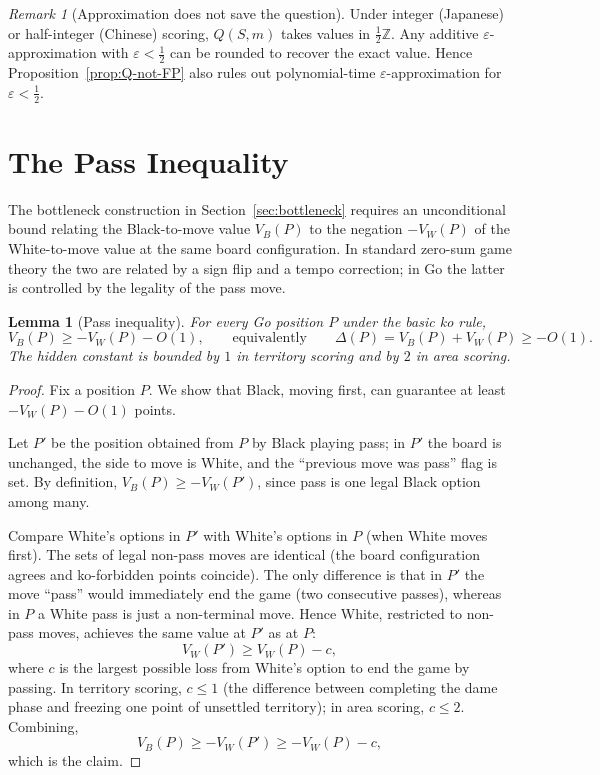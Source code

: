 \documentclass[11pt,a4paper]{amsart}
\theoremstyle{plain}
\newtheorem{lemma}[theorem]{Lemma}
\theoremstyle{definition}
\theoremstyle{remark}
\newtheorem{remark}[theorem]{Remark}
\begin{document}
\begin{remark}[Approximation does not save the question]
\label{rem:approx}
Under integer (Japanese) or half-integer (Chinese) scoring, $Q(S, m)$
takes values in $\frac{1}{2}\mathbb{Z}$. Any additive
$\varepsilon$-approximation with $\varepsilon < \frac{1}{2}$ can be
rounded to recover the exact value. Hence
Proposition~\ref{prop:Q-not-FP} also rules out polynomial-time
$\varepsilon$-approximation for $\varepsilon < \frac{1}{2}$.
\end{remark}

\section{The Pass Inequality}
\label{sec:pass}

The bottleneck construction in Section~\ref{sec:bottleneck} requires
an unconditional bound relating the Black-to-move value
$V_B(P)$ to the negation $-V_W(P)$ of the White-to-move value at the
same board configuration. In standard zero-sum game theory the two are
related by a sign flip and a tempo correction; in Go the latter is
controlled by the legality of the pass move.

\begin{lemma}[Pass inequality]
\label{lem:pass}
For every Go position $P$ under the basic ko rule,
\[
  V_B(P) \geq -V_W(P) - O(1),
  \qquad\text{equivalently}\qquad
  \Delta(P) = V_B(P) + V_W(P) \geq -O(1).
\]
The hidden constant is bounded by $1$ in territory scoring and by
$2$ in area scoring.
\end{lemma}

\begin{proof}
Fix a position $P$. We show that Black, moving first, can guarantee
at least $-V_W(P) - O(1)$ points.

Let $P'$ be the position obtained from $P$ by Black playing pass; in
$P'$ the board is unchanged, the side to move is White, and the
``previous move was pass'' flag is set. By definition,
$V_B(P) \geq -V_W(P')$, since pass is one legal Black option among many.

Compare White's options in $P'$ with White's options in $P$ (when
White moves first). The sets of legal non-pass moves are identical
(the board configuration agrees and ko-forbidden points coincide).
The only difference is that in $P'$ the move ``pass'' would
immediately end the game (two consecutive passes), whereas in $P$
a White pass is just a non-terminal move. Hence White, restricted to
non-pass moves, achieves the same value at $P'$ as at $P$:
\[
  V_W(P') \geq V_W(P) - c,
\]
where $c$ is the largest possible loss from White's option to end the
game by passing. In territory scoring, $c \leq 1$ (the difference
between completing the dame phase and freezing one point of
unsettled territory); in area scoring, $c \leq 2$. Combining,
\[
  V_B(P) \geq -V_W(P') \geq -V_W(P) - c,
\]
which is the claim.
\end{proof}
\end{document}
